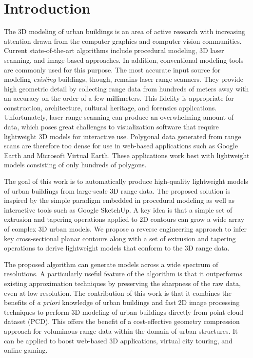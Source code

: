 \documentclass[10pt,twocolumn,letterpaper]{article}
\begin{document}
\section{Introduction}

The 3D modeling of urban buildings is an area of active research
with increasing attention drawn from the computer graphics and
computer vision communities.
Current state-of-the-art algorithms include procedural modeling,
3D laser scanning, and image-based approaches.
In addition, conventional modeling tools are commonly used for this purpose.
The most accurate input source for modeling {\it existing} buildings, though,
remains laser range scanners.
They provide high geometric detail by collecting range data from hundreds
of meters away with an accuracy on the order of a few millimeters.
This fidelity is appropriate for construction, architecture, cultural
heritage, and forensics applications.
Unfortunately, laser range scanning can produce an overwhelming amount of data,
which poses great challenges to visualization software that require lightweight
3D models for interactive use.
Polygonal data generated from range scans are therefore too dense for use in
web-based applications such as Google Earth and Microsoft Virtual Earth.
These applications work best with lightweight models consisting of only
hundreds of polygons.

The goal of this work is to automatically produce high-quality
lightweight models of urban buildings from large-scale 3D range data.
The proposed solution is inspired by the simple paradigm embedded in
procedural modeling as well as interactive tools such as Google SketchUp.
A key idea is that a simple set of extrusion and tapering
operations applied to 2D contours can grow a wide array of complex 3D urban
models.
We propose a reverse engineering approach to infer key cross-sectional
planar contours along with a set of extrusion and tapering operations to derive
lightweight models that conform to the 3D range data.

The proposed algorithm can generate models across a wide spectrum of
resolutions.
A particularly useful feature of the algorithm is that it outperforms
existing approximation techniques by preserving the sharpness of the raw
data, even at low resolution.
The contribution of this work is that it combines the benefits of
\emph{a priori} knowledge of urban buildings and fast 2D image
processing techniques to perform 3D modeling of urban buildings directly
from point cloud dataset (PCD).
This offers the benefit of a cost-effective geometry compression
approach for voluminous range data within the domain of urban structures.
It can be applied to boost web-based 3D applications, virtual city touring,
and online gaming.
\end{document}
